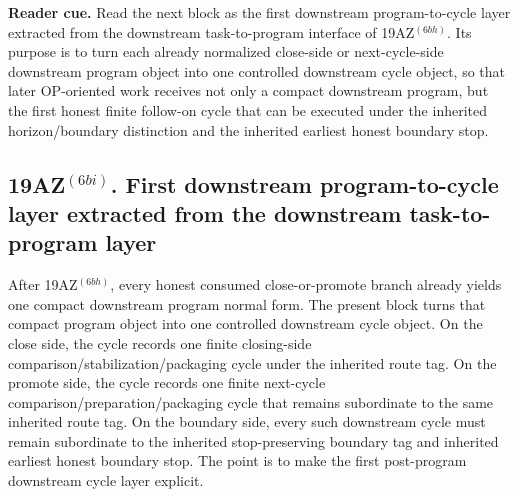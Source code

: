 \noindent\textbf{Reader cue.} Read the next block as the first downstream program-to-cycle layer extracted from the downstream task-to-program interface of 19AZ$^{(6bh)}$. Its purpose is to turn each already normalized close-side or next-cycle-side downstream program object into one controlled downstream cycle object, so that later OP-oriented work receives not only a compact downstream program, but the first honest finite follow-on cycle that can be executed under the inherited horizon/boundary distinction and the inherited earliest honest boundary stop.

\subsection*{19AZ$^{(6bi)}$. First downstream program-to-cycle layer extracted from the downstream task-to-program layer}
\label{sec:first-downstream-program-to-cycle-layer-extracted-from-the-downstream-task-to-program-layer}
After 19AZ$^{(6bh)}$, every honest consumed close-or-promote branch already yields one compact downstream program normal form. The present block turns that compact program object into one controlled downstream cycle object. On the close side, the cycle records one finite closing-side comparison/stabilization/packaging cycle under the inherited route tag. On the promote side, the cycle records one finite next-cycle comparison/preparation/packaging cycle that remains subordinate to the same inherited route tag. On the boundary side, every such downstream cycle must remain subordinate to the inherited stop-preserving boundary tag and inherited earliest honest boundary stop. The point is to make the first post-program downstream cycle layer explicit.


